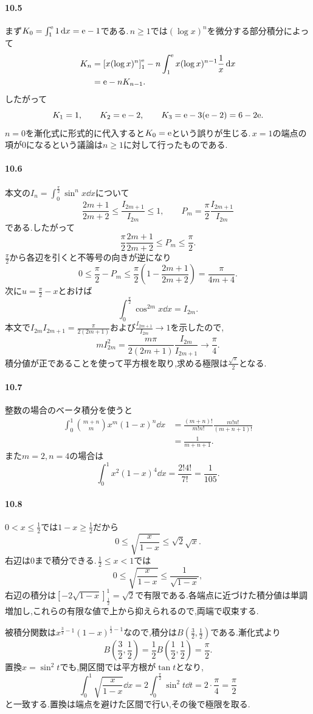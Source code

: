 \paragraph{10.5}
まず$K_0=\int_1^{\mathrm{e}}1\,\mathrm{d} x=\mathrm{e}-1$である.\,$n\ge1$では$(\log x)^n$を微分する部分積分によって
\begin{align*}
 K_n
 &=\left[x(\log x)^n\right]_1^{\mathrm{e}}
   -n\int_1^{\mathrm{e}}x(\log x)^{n-1}\frac1x\,\mathrm{d} x\\
 &=\mathrm{e}-nK_{n-1}.
\end{align*}
したがって
\[
 K_1=1,\qquad K_2=\mathrm{e}-2,\qquad K_3=\mathrm{e}-3(\mathrm{e}-2)=6-2\mathrm{e}.
\]
$n=0$を漸化式に形式的に代入すると$K_0=\mathrm{e}$という誤りが生じる.\,$x=1$の端点の項が$0$になるという議論は$n\ge1$に対して行ったものである.

\paragraph{10.6}
本文の$I_n=\int_0^{\frac{\pi}{2}}\sin^n x\dd x$について
\[
 \frac{2m+1}{2m+2}
 \le\frac{I_{2m+1}}{I_{2m}}\le1,
 \qquad
 P_m=\frac{\pi}{2}\frac{I_{2m+1}}{I_{2m}}
\]
である.したがって
\[
 \frac{\pi}{2}\frac{2m+1}{2m+2}
 \le P_m\le\frac{\pi}{2}.
\]
$\frac{\pi}{2}$から各辺を引くと不等号の向きが逆になり
\[
 0\le\frac{\pi}{2}-P_m
 \le\frac{\pi}{2}\left(1-\frac{2m+1}{2m+2}\right)
 =\frac{\pi}{4m+4}.
\]
次に$u=\frac{\pi}{2}-x$とおけば
\[
 \int_0^{\frac{\pi}{2}}\cos^{2m}x\dd x=I_{2m}.
\]
本文で$I_{2m}I_{2m+1}=\frac{\pi}{2(2m+1)}$および$\frac{I_{2m+1}}{I_{2m}}\to1$を示したので,
\[
 mI_{2m}^2
 =\frac{m\pi}{2(2m+1)}\frac{I_{2m}}{I_{2m+1}}
 \longrightarrow\frac{\pi}{4}.
\]
積分値が正であることを使って平方根を取り,求める極限は$\frac{\sqrt\pi}{2}$となる.

\paragraph{10.7}
整数の場合のベータ積分を使うと
\begin{align*}
 \int_0^1\binom{m+n}{m}x^m(1-x)^n\dd x
 &=\frac{(m+n)!}{m!n!}\frac{m!n!}{(m+n+1)!}\\
 &=\frac1{m+n+1}.
\end{align*}
また$m=2,n=4$の場合は
\[
 \int_0^1x^2(1-x)^4\dd x
 =\frac{2!4!}{7!}=\frac1{105}.
\]

\paragraph{10.8}
$0<x\le\frac12$では$1-x\ge\frac12$だから
\[
 0\le\sqrt{\frac{x}{1-x}}\le\sqrt2\sqrt x.
\]
右辺は$0$まで積分できる.\,$\frac12\le x<1$では
\[
 0\le\sqrt{\frac{x}{1-x}}\le\frac1{\sqrt{1-x}},
\]
右辺の積分は$[-2\sqrt{1-x}]_{\frac12}^{1}=\sqrt2$で有限である.各端点に近づけた積分値は単調増加し,これらの有限な値で上から抑えられるので,両端で収束する.

被積分関数は$x^{\frac32-1}(1-x)^{\frac12-1}$なので,積分は$B\left(\frac32,\frac12\right)$である.漸化式より
\[
 B\left(\frac32,\frac12\right)
 =\frac12 B\left(\frac12,\frac12\right)=\frac{\pi}{2}.
\]
置換$x=\sin^2t$でも,開区間では平方根が$\tan t$となり,
\[
 \int_0^1\sqrt{\frac{x}{1-x}}\dd x
 =2\int_0^{\frac{\pi}{2}}\sin^2t\dd t
 =2\cdot\frac{\pi}{4}=\frac{\pi}{2}
\]
と一致する.置換は端点を避けた区間で行い,その後で極限を取る.
